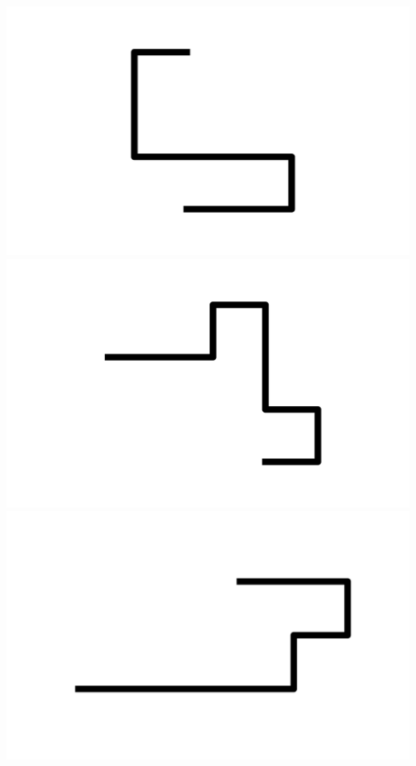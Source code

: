 \documentclass[]{report}
\begin{document}
\includegraphics[scale=.1]{pictures/21/state_cluster_shapes_370.pdf} 
\includegraphics[scale=.1]{pictures/21/state_cluster_shapes_371.pdf} 
\includegraphics[scale=.1]{pictures/21/state_cluster_shapes_372.pdf} 
\end{document}
